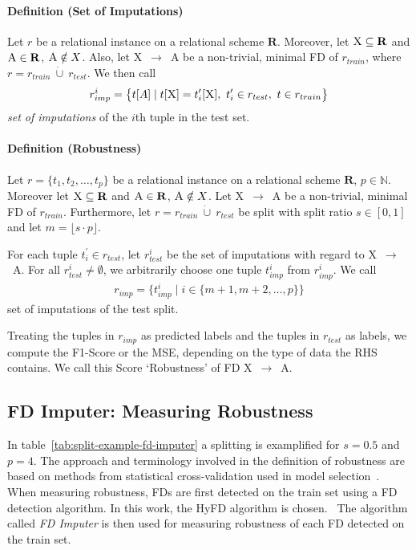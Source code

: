 \paragraph{Definition (Set of Imputations)}
Let \( r \) be a relational instance on a relational scheme \( \mathbf{R} \).
Moreover, let \( \textsc{X} \subseteq \mathbf{R} \) and \( \textsc{A} \in \mathbf{R} \), \( \textsc{A} \notin X\).
Also, let \textsc{X}~\( \rightarrow \)~\textsc{A} be a non-trivial, minimal FD of \( r_{train} \), where \( r = r_{train}~\dot\cup~r_{test} \).
We then call
\begin{align}
    r_{imp}^{i} = \big\{ t[A] \mid t[\textsc{X}] = t^{\prime}_{i}[\textsc{X}],~t^{\prime}_{i} \in r_{test},~t \in r_{train} \big\}
\end{align}
\emph{set of imputations} of the \( i \)th tuple in the test set.

\paragraph{Definition (Robustness)}
Let \( r = \{ t_1, t_2, \dots, t_p \}\) be a relational instance on a relational scheme \( \mathbf{R} \), \( p \in \mathbb{N} \).
Moreover let \( \textsc{X} \subseteq \mathbf{R} \) and \( \textsc{A} \in \mathbf{R} \), \( \textsc{A} \notin X\).
Let \textsc{X}~\( \rightarrow \)~\textsc{A} be a non-trivial, minimal FD of \( r_{train} \).
Furthermore, let \( r = r_{train}~\dot\cup~r_{test} \) be split with split ratio \( s \in [0, 1] \) and let \( m = \lfloor s \cdot p \rfloor \).

For each tuple \( t^{\prime}_i \in r_{test} \), let \( r^{i}_{test} \) be the set of imputations with regard to \textsc{X}~\( \rightarrow \)~\textsc{A}.
For all \( r^{i}_{test} \neq \emptyset \), we arbitrarily choose one tuple \( t_{imp}^{i} \) from \( r_{imp}^i \).
We call
\begin{align}\label{eq:imputation-set}
    r_{imp} = \big\{ t_{imp}^{i} \mid i \in \{ m + 1, m + 2, \dots, p \} \big\}
\end{align}
set of imputations of the test split.

Treating the tuples in \( r_{imp} \) as predicted labels and the tuples in \( r_{test} \) as labels, we compute the F1-Score or the MSE, depending on the type of data the RHS contains.
We call this Score `Robustness' of FD \textsc{X}~\( \rightarrow \)~\textsc{A}.


\subsection{FD Imputer: Measuring Robustness}
In table~\ref{tab:split-example-fd-imputer} a splitting is examplified for \( s = 0.5 \) and \( p=4 \).
The approach and terminology involved in the definition of robustness are based on methods from statistical cross-validation used in model selection~\cite[p.~172]{HAY09}.
When measuring robustness, FDs are first detected on the train set using a FD detection algorithm.
In this work, the HyFD algorithm is chosen.~\cite{PAP16}
The algorithm called \emph{FD Imputer} is then used for measuring robustness of each FD detected on the train set.

